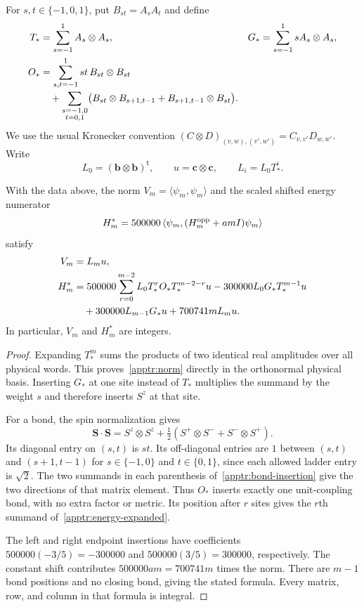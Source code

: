 For $s,t\in\{-1,0,1\}$, put $B_{st}=A_sA_t$ and define
\begin{align}
 T_*&=\sum_{s=-1}^{1}A_s\otimes A_s,
 &G_*&=\sum_{s=-1}^{1}sA_s\otimes A_s,
 \label{apptr:one-site-transfers}\\
 O_*&=\sum_{s,t=-1}^{1}st\,B_{st}\otimes B_{st}
 \notag\\[-2pt]
 &\quad+
 \sum_{\substack{s=-1,0\\t=0,1}}
 \bigl(B_{st}\otimes B_{s+1,t-1}
       +B_{s+1,t-1}\otimes B_{st}\bigr).
 \label{apptr:bond-insertion}
\end{align}
We use the usual Kronecker convention
$(C\otimes D)_{(v,w),(v',w')}=C_{v,v'}D_{w,w'}$.
Write
\begin{equation}\label{apptr:boundary-tensors}
 L_0=(\mathbf b\otimes\mathbf b)^{\mathsf t},
 \qquad u=\mathbf c\otimes\mathbf c,
 \qquad L_i=L_0T_*^i.
\end{equation}

\begin{lemma}\label{apptr:contractions}
With the data above, the norm $V_m=\langle\psi_m,\psi_m\rangle$
and the scaled shifted energy numerator
\[
 H_m^*=500000\,
 \langle\psi_m,(H_m^{\mathrm{opp}}+amI)\psi_m\rangle
\]
satisfy
\begin{align}
 V_m&=L_mu,\label{apptr:norm}\\
 H_m^*&=500000\sum_{r=0}^{m-2}
          L_0T_*^rO_*T_*^{m-2-r}u
       -300000L_0G_*T_*^{m-1}u\notag\\
 &\quad+300000L_{m-1}G_*u+700741mL_mu.
 \label{apptr:energy-expanded}
\end{align}
In particular, $V_m$ and $H_m^*$ are integers.
\end{lemma}

\begin{proof}
Expanding $T_*^m$ sums the products of two identical real amplitudes
over all physical words.  This proves~\eqref{apptr:norm} directly in
the orthonormal physical basis.  Inserting $G_*$ at one site instead
of $T_*$ multiplies the summand by the weight $s$ and therefore
inserts $S^z$ at that site.

For a bond, the spin normalization gives
\[
 \mathbf S\cdot\mathbf S
 =S^z\otimes S^z+\tfrac12
   (S^+\otimes S^-+S^-\otimes S^+).
\]
Its diagonal entry on $(s,t)$ is $st$.  Its off-diagonal entries are
$1$ between $(s,t)$ and $(s+1,t-1)$ for
$s\in\{-1,0\}$ and $t\in\{0,1\}$, since each allowed ladder
entry is $\sqrt2$.  The two summands in each parenthesis
of~\eqref{apptr:bond-insertion} give the two directions of that
matrix element.  Thus $O_*$ inserts exactly one unit-coupling bond,
with no extra factor or metric.  Its position after $r$ sites gives
the $r$th summand of~\eqref{apptr:energy-expanded}.

The left and right endpoint insertions have coefficients
$500000(-3/5)=-300000$ and $500000(3/5)=300000$, respectively.
The constant shift contributes $500000am=700741m$ times the norm.
There are $m-1$ bond positions and no closing bond, giving the stated
formula.  Every matrix, row, and column in that formula is integral.
\end{proof}


